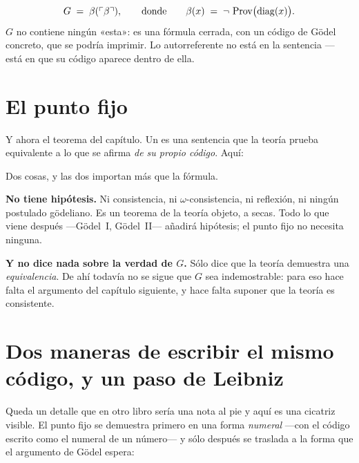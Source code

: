 
\begin{matematica}
\[ G \;=\; \beta(\ulcorner \beta \urcorner), \qquad\text{donde}\qquad
   \beta(x) \;=\; \lnot\,\operatorname{Prov}\bigl(\mathrm{diag}(x)\bigr). \]
$G$ no contiene ningún «esta»: es una fórmula cerrada, con un código de Gödel concreto, que se
podría imprimir. Lo autorreferente no está en la sentencia — está en que su código aparece dentro
de ella.
\end{matematica}

\section{El punto fijo}

Y ahora el teorema del capítulo. Un  es una sentencia que la
teoría prueba equivalente a lo que se afirma \emph{de su propio código}. Aquí:



\begin{leccion}
Dos cosas, y las dos importan más que la fórmula.

\textbf{No tiene hipótesis.} Ni consistencia, ni $\omega$-consistencia, ni reflexión, ni ningún
postulado gödeliano. Es un teorema de la teoría objeto, a secas. Todo lo que viene después
—Gödel~I, Gödel~II— añadirá hipótesis; el punto fijo no necesita ninguna.

\textbf{Y no dice nada sobre la verdad de $G$.} Sólo dice que la teoría demuestra una
\emph{equivalencia}. De ahí todavía no se sigue que $G$ sea indemostrable: para eso hace falta el
argumento del capítulo siguiente, y hace falta suponer que la teoría es consistente.
\end{leccion}

\section{Dos maneras de escribir el mismo código, y un paso de Leibniz}

Queda un detalle que en otro libro sería una nota al pie y aquí es una cicatriz visible. El punto
fijo se demuestra primero en una forma \emph{numeral} —con el código escrito como el numeral de un
número— y sólo después se traslada a la forma que el argumento de Gödel espera:

